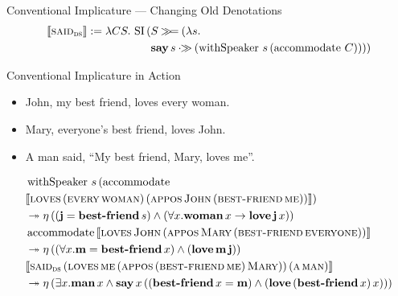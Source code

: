 \documentclass{beamer}
\begin{document}
\begin{frame}{Conventional Implicature --- Changing Old Denotations}
\begin{align*}
  \llbracket \textsc{said}_{\textsc{ds}} \rrbracket := \lambda C S.\, \operatorname{SI}\,( & S \mathbin{\gg\!=} (\lambda s.\, 
        \\ & \textbf{say}\,s \mathbin{\cdot\!\!\gg} (\operatorname{withSpeaker}\,s\,(\operatorname{accommodate}\,C))))
\end{align*}
\end{frame}


\begin{frame}{Conventional Implicature in Action}
 
\begin{itemize}
  \item John, my best friend, loves every woman.
  \item Mary, everyone's best friend, loves John.
  \item A man said, ``My best friend, Mary, loves me''.
\end{itemize}

\vfill
\pause

\begin{align*}
  & \operatorname{withSpeaker}\,s\,(\operatorname{accommodate}\,\\
      &\llbracket \textsc{loves}\,(\textsc{every}\,\textsc{woman})\,(\textsc{appos}\,\textsc{John}\,(\textsc{best-friend}\,\textsc{me})) \rrbracket) \nonumber \\
  & \twoheadrightarrow \eta\,((\textbf{j} = \textbf{best-friend}\,s) \land (\forall x. \textbf{woman}\,x \to \textbf{love}\,\textbf{j}\,x)) \\
  & \operatorname{accommodate}\,\llbracket \textsc{loves}\,\textsc{John}\,(\textsc{appos}\,\textsc{Mary}\,(\textsc{best-friend}\,\textsc{everyone})) \rrbracket \nonumber \\
  & \twoheadrightarrow \eta\,((\forall x. \textbf{m} = \textbf{best-friend}\,x) \land (\textbf{love}\,\textbf{m}\,\textbf{j})) \\
  & \llbracket \textsc{said}_{\textsc{ds}}\,(\textsc{loves}\,\textsc{me}\,(\textsc{appos}\,(\textsc{best-friend}\,\textsc{me})\,\textsc{Mary}))\,(\textsc{a}\,\textsc{man}) \rrbracket \nonumber \\
  & \twoheadrightarrow \eta\,(\exists x. \textbf{man}\,x \land \textbf{say}\,x\,((\textbf{best-friend}\,x = \textbf{m}) \land (\textbf{love}\,(\textbf{best-friend}\,x)\,x)))
\end{align*}
 
\end{frame}
\end{document}
